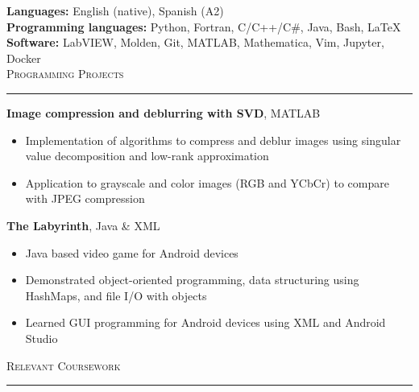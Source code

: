 \documentclass{article}
\newcommand{\return}{\\[6pt]}
\newcommand{\sect}[1]{
\noindent\large{\textsc{#1}}\\[-6pt]\normalsize{\noindent\rule{\textwidth}{0.5pt}}
}
\begin{document}
\textbf{Languages:} English (native), Spanish (A2) \return
\textbf{Programming languages:} Python, Fortran, C/C++/C\#, Java, Bash, \LaTeX \return
\textbf{Software:} LabVIEW, Molden, Git, MATLAB, Mathematica, Vim, Jupyter, Docker \return
\sect{Programming Projects}
\textbf{Image compression and deblurring with SVD}, MATLAB 
\begin{itemize}
	\item Implementation of algorithms to compress and deblur images using singular value decomposition and low-rank approximation
	\item Application to grayscale and color images (RGB and YCbCr) to compare with JPEG compression
\end{itemize} 
\textbf{The Labyrinth}, Java \& XML
\begin{itemize}
	\item Java based video game for Android devices
	\item Demonstrated object-oriented programming, data structuring using HashMaps, and file I/O with objects
	\item Learned GUI programming for Android devices using XML and Android Studio
\end{itemize}
\newpage
\sect{Relevant Coursework}
\end{document}
